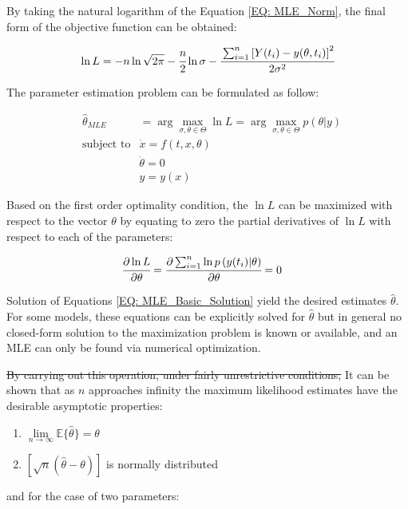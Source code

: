\documentclass[../Parameter_fitting.tex]{subfiles}
\begin{document}
		By taking the natural logarithm of the Equation \ref{EQ: MLE_Norm}, the final form of the objective function can be obtained:
		
		{\footnotesize
			\begin{equation}
				\ln L = -n \ln \sqrt{2 \pi} - \cfrac{n}{2} \ln \sigma
				- \cfrac{ \sum_{i=1}^{n} \left[  Y(t_i) - y(\theta , t_i) \right]^2 }{2 \sigma^2}
			\end{equation}
		}
		
		The parameter estimation problem can be formulated as follow:
		
		{\footnotesize
			\begin{equation}
				\begin{aligned}
					&\hat{\theta}_{MLE} &= \arg \max_{\sigma, \theta \in \Theta} \ln L = \arg \max_{\sigma,\theta \in \Theta} p(\theta|y) \\
					&\text{subject to}
					& \dot{x} = f(t,x,\theta) \\
					&& \dot{\theta} = 0 \\
					&& y = y(x)
				\end{aligned}
		\end{equation} }
		
		{\color{red}Based on the first order optimality condition,} the $\ln L$ can be maximized with respect to the vector $\theta$ by equating to zero the partial derivatives of $\ln L$ with respect to each of the parameters:
		
		{\footnotesize
			\begin{align}\label{EQ: MLE_Basic_Solution}
				\cfrac{\partial \ln L}{\partial \theta} &= \cfrac{\partial \sum_{i=1}^{n} \ln p\left( y(t_i) | \theta \right) }{\partial \theta} = 0 
		\end{align} }
		
		Solution of Equations \ref{EQ: MLE_Basic_Solution} yield the desired estimates $\hat{\theta}$. For some models, these equations can be explicitly solved for $\hat{\theta}$ but in general no closed-form solution to the maximization problem is known or available, and an MLE can only be found via numerical optimization.
		
		\sout{By carrying out this operation, under fairly unrestrictive conditions,} 
		It can be shown that as $n$ approaches infinity the maximum likelihood estimates have the desirable asymptotic properties:
		
		\begin{enumerate}[label=(\arabic*)]
			\item {\footnotesize $\lim\limits_{n \rightarrow \infty} \mathbb{E}\{\hat{\theta}\} = \theta$ }
			\item {\footnotesize $\left[ \sqrt{n}\left( \hat{\theta} - \theta \right) \right]$ } is normally distributed
		\end{enumerate}
		and for the case of two parameters:
		
\end{document}
